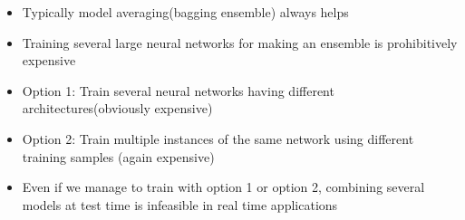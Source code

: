 \documentclass[serif,aspectratio=169]{beamer}
\begin{document}
\begin{frame}
\begin{columns}
{\begin{minipage}{0.31\textwidth}
		\end{minipage}}
		\begin{overlayarea}{\textwidth}{\textheight}
			\begin{itemize}
				\justifying
				\item<1->  Typically model averaging(bagging ensemble) always helps
				\item <2-> Training several large neural networks for making an ensemble is prohibitively expensive
				\item<3->  Option 1: Train several neural networks having different architectures(obviously expensive)
				\item<4->  Option 2: Train multiple instances of the same network using different training samples (again expensive)
				\item<5->  Even if we manage to train with option 1 or option 2, combining several models at test time is infeasible in real time applications
			\end{itemize}
		\end{overlayarea}
	\end{columns}
\end{frame}
				
\end{document}
